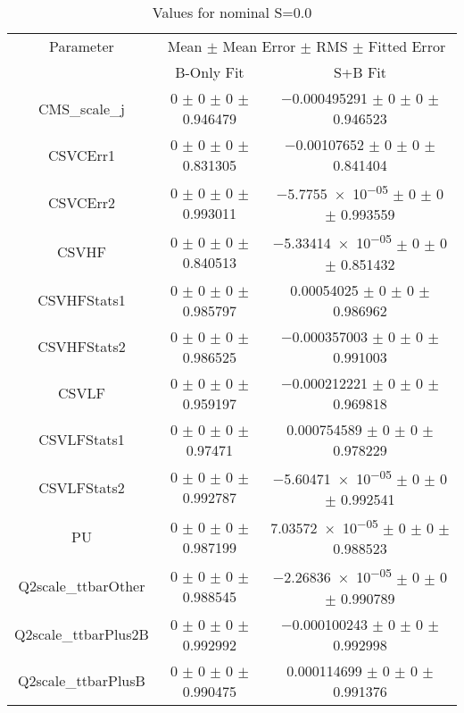 \begin{table}
\centering
\caption{Values for nominal S=0.0}
\begin{tabular}{ccc}
\toprule
Parameter & \multicolumn{2}{c}{Mean $\pm$ Mean Error $\pm$ RMS $\pm$ Fitted Error}\\
 & B-Only Fit & S+B Fit\\
\midrule
CMS\_scale\_j & \num{0} $\pm$ \num{0} $\pm$ \num{0} $\pm$ \num{0.946479} & \num{-0.000495291} $\pm$ \num{0} $\pm$ \num{0} $\pm$ \num{0.946523}\\
CSVCErr1 & \num{0} $\pm$ \num{0} $\pm$ \num{0} $\pm$ \num{0.831305} & \num{-0.00107652} $\pm$ \num{0} $\pm$ \num{0} $\pm$ \num{0.841404}\\
CSVCErr2 & \num{0} $\pm$ \num{0} $\pm$ \num{0} $\pm$ \num{0.993011} & \num{-5.7755e-05} $\pm$ \num{0} $\pm$ \num{0} $\pm$ \num{0.993559}\\
CSVHF & \num{0} $\pm$ \num{0} $\pm$ \num{0} $\pm$ \num{0.840513} & \num{-5.33414e-05} $\pm$ \num{0} $\pm$ \num{0} $\pm$ \num{0.851432}\\
CSVHFStats1 & \num{0} $\pm$ \num{0} $\pm$ \num{0} $\pm$ \num{0.985797} & \num{0.00054025} $\pm$ \num{0} $\pm$ \num{0} $\pm$ \num{0.986962}\\
CSVHFStats2 & \num{0} $\pm$ \num{0} $\pm$ \num{0} $\pm$ \num{0.986525} & \num{-0.000357003} $\pm$ \num{0} $\pm$ \num{0} $\pm$ \num{0.991003}\\
CSVLF & \num{0} $\pm$ \num{0} $\pm$ \num{0} $\pm$ \num{0.959197} & \num{-0.000212221} $\pm$ \num{0} $\pm$ \num{0} $\pm$ \num{0.969818}\\
CSVLFStats1 & \num{0} $\pm$ \num{0} $\pm$ \num{0} $\pm$ \num{0.97471} & \num{0.000754589} $\pm$ \num{0} $\pm$ \num{0} $\pm$ \num{0.978229}\\
CSVLFStats2 & \num{0} $\pm$ \num{0} $\pm$ \num{0} $\pm$ \num{0.992787} & \num{-5.60471e-05} $\pm$ \num{0} $\pm$ \num{0} $\pm$ \num{0.992541}\\
PU & \num{0} $\pm$ \num{0} $\pm$ \num{0} $\pm$ \num{0.987199} & \num{7.03572e-05} $\pm$ \num{0} $\pm$ \num{0} $\pm$ \num{0.988523}\\
Q2scale\_ttbarOther & \num{0} $\pm$ \num{0} $\pm$ \num{0} $\pm$ \num{0.988545} & \num{-2.26836e-05} $\pm$ \num{0} $\pm$ \num{0} $\pm$ \num{0.990789}\\
Q2scale\_ttbarPlus2B & \num{0} $\pm$ \num{0} $\pm$ \num{0} $\pm$ \num{0.992992} & \num{-0.000100243} $\pm$ \num{0} $\pm$ \num{0} $\pm$ \num{0.992998}\\
Q2scale\_ttbarPlusB & \num{0} $\pm$ \num{0} $\pm$ \num{0} $\pm$ \num{0.990475} & \num{0.000114699} $\pm$ \num{0} $\pm$ \num{0} $\pm$ \num{0.991376}\\

\end{tabular}
\end{table}
